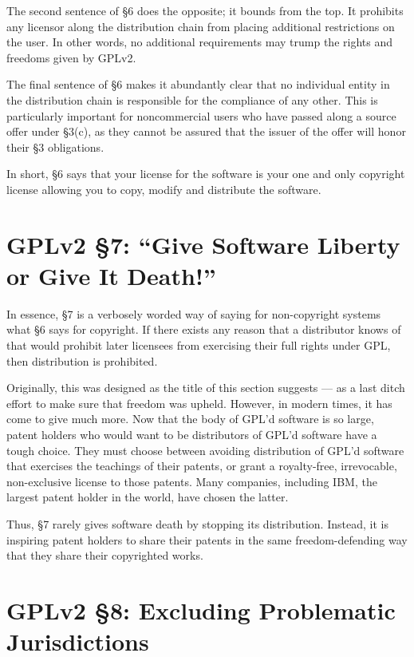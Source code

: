 The second sentence of \S 6 does the opposite; it bounds from the top. It
prohibits any licensor along the distribution chain from placing
additional restrictions on the user. In other words, no additional
requirements may trump the rights and freedoms given by GPLv2\@.

The final sentence of \S 6 makes it abundantly clear that no individual
entity in the distribution chain is responsible for the compliance of any
other. This is particularly important for noncommercial users who have
passed along a source offer under \S 3(c), as they cannot be assured that
the issuer of the offer will honor their \S 3 obligations.

In short, \S 6 says that your license for the software is your one and
only copyright license allowing you to copy, modify and distribute the
software.

\section{GPLv2 \S 7: ``Give Software Liberty or Give It Death!''}
\label{GPLs7}

In essence, \S 7 is a verbosely worded way of saying for non-copyright
systems what \S 6 says for copyright. If there exists any reason that a
distributor knows of that would prohibit later licensees from exercising
their full rights under GPL, then distribution is prohibited.

Originally, this was designed as the title of this section suggests --- as
a last ditch effort to make sure that freedom was upheld. However, in
modern times, it has come to give much more. Now that the body of GPL'd
software is so large, patent holders who would want to be distributors of
GPL'd software have a tough choice. They must choose between avoiding
distribution of GPL'd software that exercises the teachings of their
patents, or grant a royalty-free, irrevocable, non-exclusive license to
those patents. Many companies, including IBM, the largest patent holder
in the world, have chosen the latter.

Thus, \S 7 rarely gives software death by stopping its distribution.
Instead, it is inspiring patent holders to share their patents in the same
freedom-defending way that they share their copyrighted works.

\section{GPLv2 \S 8: Excluding Problematic Jurisdictions}
\label{GPLs8}

